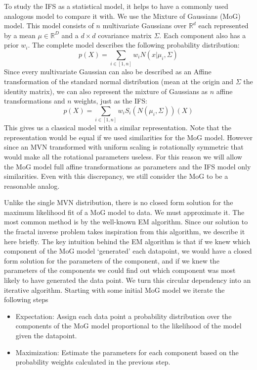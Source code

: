 \documentclass[11pt]{article}
\theoremstyle{definition}
\begin{document}
To study the IFS as a statistical model, it helps to have a commonly used analogous model to compare it with. We use the Mixture of Gaussians (MoG) model. This model consists of $n$ multivariate Gaussians over ${\mathbb R}^d$ each represented by a mean $\mu \in {\mathbb R}^D$ and a $d \times d$ covariance matrix $\Sigma$. Each component also has a prior $w_i$. The complete model describes the following probability distribution:
\[
p(X) = \sum_{i \in [1,n]} w_i N(x|\mu_i, \Sigma)
\]
Since every multivariate Gaussian can also be described as an Affine transformation of the standard normal distribution (mean at the origin and $\Sigma$ the identity matrix), we can also represent the mixture of Gaussians as $n$ affine transformations and $n$ weights, just as the IFS:
\[
p(X) = \sum_{i \in [1,n]} w_i S_i(N(\mu_i, \Sigma))(X)
\]
This gives us a classical model with a similar representation. Note that the representation would be equal if we used similarities for the MoG model. However since an MVN transformed with uniform scaling is rotationally symmetric that would make all the rotational parameters useless. For this reason we will allow the MoG model full affine transformations as parameters and the IFS model only similarities. Even with this discrepancy, we still consider the MoG to be a reasonable analog.

Unlike the single MVN distribution, there is no closed form solution for the maximum likelihood fit of a MoG model to data. We must approximate it. The most common method is by the well-known EM algorithm. Since our solution to the fractal inverse problem takes inspiration from this algorithm, we describe it here briefly. The key intuition behind the EM algorithm is that if we knew which component of the MoG model `generated' each datapoint, we would have a closed form solution for the parameters of the component, and if we knew the parameters of the components we could find out which component was most likely to have generated the data point. We turn this circular dependency into an iterative algorithm. Starting with some initial MoG model we iterate the following steps

\begin{itemize}
  \item Expectation: Assign each data point a probability distribution over the components of the MoG model proportional to the likelihood of the model given the datapoint.
  \item Maximization: Estimate the parameters for each component based on the probability weights calculated in the previous step.  
\end{itemize} 
\end{document}
